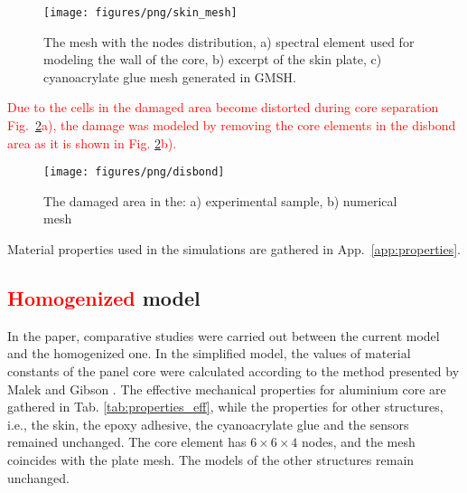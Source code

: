 \documentclass[sensors,article,submit,moreauthors,pdftex]{Definitions/mdpi}
\begin{document}
\begin{figure}
	\begin{center}
		\texttt{[image: figures/png/skin\_mesh]}
	\end{center}
	\caption{The mesh with the nodes distribution, a) spectral element used for modeling the wall of the core, b) excerpt of the skin plate, c) cyanoacrylate glue mesh generated in GMSH.}
	\label{fig:skin_mesh}
\end{figure}
\textcolor{red}{Due to the cells in the damaged area become distorted during core separation Fig.~\ref{fig:disbond}a), the damage was modeled by removing the core elements in the disbond area as it is shown in Fig. \ref{fig:disbond}b).}
\begin{figure}
	\begin{center}
		\texttt{[image: figures/png/disbond]}
	\end{center}
	\caption{The damaged area in the: a) experimental sample, b) numerical mesh}
	\label{fig:disbond}
\end{figure}
Material properties used in the simulations are gathered in App.~\ref{app:properties}.
\subsection{\textcolor{red}{Homogenized} model}
\label{sec:homogenization}
In the paper, comparative studies were carried out between the current model and the homogenized one. 
In the simplified model, the values of material constants of the panel core were calculated according to the method presented by Malek and Gibson \cite{malek2015effective}.
The effective mechanical properties for aluminium core are gathered in Tab. \ref{tab:properties_eff}, while the properties for other structures, i.e., the skin, the epoxy adhesive, the cyanoacrylate glue and the sensors remained unchanged.
The core element has \(6 \times 6 \times 4\) nodes, and the mesh coincides with the plate mesh. The models of the other structures remain unchanged.
\color{red}
\end{document}
